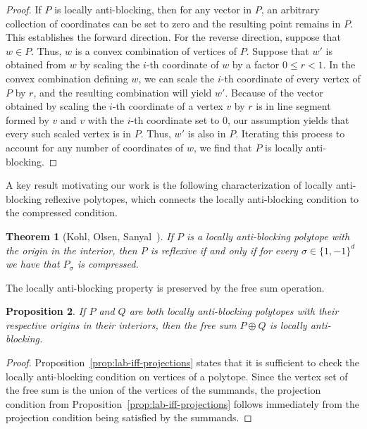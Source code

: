 \documentclass[12pt]{amsart}
\newtheorem{theorem}{Theorem}[section]
\newtheorem{proposition}[theorem]{Proposition}
\theoremstyle{definition}
\begin{document}
\begin{proof}
If $P$ is locally anti-blocking, then for any vector in $P$, an arbitrary collection of coordinates can be set to zero and the resulting point remains in $P$. 
This establishes the forward direction.
For the reverse direction, suppose that $w\in P$.
Thus, $w$ is a convex combination of vertices of $P$.
Suppose that $w'$ is obtained from $w$ by scaling the $i$-th coordinate of $w$ by a factor $0\leq r <1$.
In the convex combination defining $w$, we can scale the $i$-th coordinate of every vertex of $P$ by $r$, and the resulting combination will yield $w'$. 
Because of the vector obtained by scaling the $i$-th coordinate of a vertex $v$ by $r$ is in line segment formed by $v$ and $v$ with the $i$-th coordinate set to $0$, our assumption yields that every such scaled vertex is in $P$.
Thus, $w'$ is also in $P$.
Iterating this process to account for any number of coordinates of $w$, we find that $P$ is locally anti-blocking.
\end{proof}

A key result motivating our work is the following characterization of locally anti-blocking reflexive polytopes, which connects the locally anti-blocking condition to the compressed condition.

\begin{theorem}[Kohl, Olsen, Sanyal~\cite{kohlolsensanyal}]\label{thm:labcompressed}
If $P$ is a locally anti-blocking polytope with the origin in the interior, then $P$ is reflexive if and only if for every $\sigma\in \{1,-1\}^d$ we have that $P_\sigma$ is compressed.
\end{theorem}

The locally anti-blocking property is preserved by the free sum operation.

\begin{proposition}\label{prop:labfreesum}
    If $P$ and $Q$ are both locally anti-blocking polytopes with their respective origins in their interiors, then the free sum $P\oplus Q$ is locally anti-blocking.
\end{proposition}

\begin{proof}
Proposition~\ref{prop:lab-iff-projections} states that it is sufficient to check the locally anti-blocking condition on vertices of a polytope.
Since the vertex set of the free sum is the union of the vertices of the summands, the projection condition from Proposition~\ref{prop:lab-iff-projections} follows immediately from the projection condition being satisfied by the summands.
\end{proof}
\end{document}
